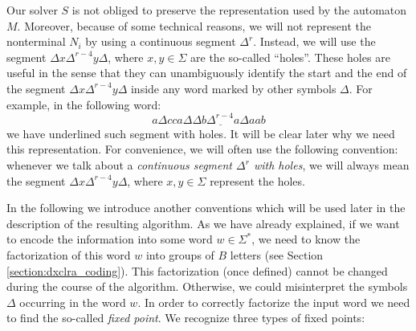 Our solver $S$ is not obliged to preserve the representation used by the automaton $M$. Moreover, because of some technical reasons, we will not represent the nonterminal $N_i$ by using a continuous segment $\Delta^r$. Instead, we will use the segment $\Delta x \Delta^{r-4} y \Delta$, where $x, y \in \Sigma$ are the so-called ``holes''. These holes are useful in the sense that they can unambiguously identify the start and the end of the segment $\Delta x \Delta^{r-4} y \Delta$ inside any word marked by other symbols $\Delta$. For example, in the following word:
$$a \Delta c ca\Delta \underline{\Delta b \Delta^{r-4} a \Delta} aab$$
we have underlined such segment with holes. It will be clear later why we need this representation. For convenience, we will often use the following convention: whenever we talk about a \emph{continuous segment $\Delta^r$ with holes}, we will always mean the segment $\Delta x \Delta^{r-4} y \Delta$, where $x, y \in \Sigma$ represent the holes.

In the following we introduce another conventions which will be used later in the description of the resulting algorithm. As we have already explained, if we want to encode the information into some word $w \in \Sigma^*$, we need to know the factorization of this word $w$ into groups of $B$ letters (see Section \ref{section:dxclra_coding}). This factorization (once defined) cannot be changed during the course of the algorithm. Otherwise, we could misinterpret the symbols $\Delta$ occurring in the word $w$. In order to correctly factorize the input word we need to find the so-called \emph{fixed point}. We recognize three types of fixed points:

